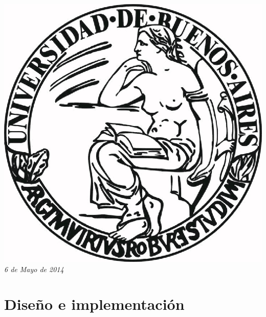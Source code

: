 \documentclass{article}
\begin{document}
\begin{titlepage}
\includegraphics[scale=0.5]{img/UBA.jpg}\\[1cm] %


{\large \text \em {6 de Mayo de 2014}}\\[3cm] %
 

\vfill %

\end{titlepage}

\tableofcontents

\newpage

\section{Diseño e implementación}
\end{document}
